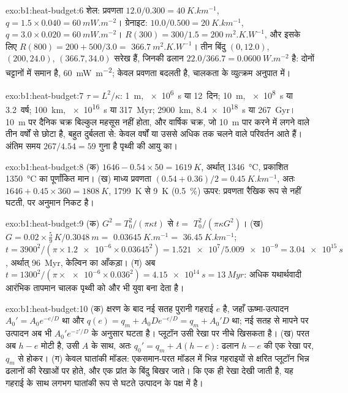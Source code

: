 \begin{solution}{exo:b1:heat-budget:6}
शेल: प्रवणता $12.0/0.300 = \qty{40}{K.km^{-1}}$, $q = 1.5\times0.040 =
\qty{60}{mW.m^{-2}}$। ग्रेनाइट: $10.0/0.500 = \qty{20}{K.km^{-1}}$,
$q = 3.0\times0.020 = \qty{60}{mW.m^{-2}}$। $R(300) = 300/1.5 =
\qty{200}{m^2.K.W^{-1}}$, और इसके लिए $R(800) = 200 + 500/3.0 =$ $\qty{366.7}{m^2.K.W^{-1}}$।
तीन बिंदु $(0, 12.0)$, $(200, 24.0)$, $(366.7, 34.0)$ सरेख हैं, जिनकी ढलान $22.0/366.7 = \qty{0.0600}{W.m^{-2}}$ है:  दोनों चट्टानों में
समान है, \qty{60}{mW.m^{-2}}; केवल प्रवणता बदलती है, चालकता के व्युत्क्रम अनुपात में।
\end{solution}

\begin{solution}{exo:b1:heat-budget:7}
$\tau = L^2/\kappa$: \qty{1}{m}, \qty{e6}{s} या \num{12}~दिन; \qty{10}{m},
\qty{e8}{s} या \num{3.2}~वर्ष; \qty{100}{km}, \qty{e16}{s} या
\qty{317}{Myr}; \qty{2900}{km}, \qty{8.4e18}{s} या \qty{267}{Gyr}। \qty{10}{m} पर दैनिक चक्र बिल्कुल महसूस नहीं होता, और वार्षिक चक्र, जो \qty{10}{m} पार करने में लगने वाले तीन वर्षों से छोटा है, बहुत दुर्बलता से: केवल वर्षों या उससे अधिक तक चलने वाले परिवर्तन आते हैं। अंतिम समय $267/4.54 = 59$ गुना है पृथ्वी की आयु का।
\end{solution}

\begin{solution}{exo:b1:heat-budget:8}
(क) $1646 - 0.54\times50 = \qty{1619}{K}$, अर्थात् \qty{1346}{\degreeCelsius},
प्रकाशित \qty{1350}{\degreeCelsius} का पूर्णांकित मान। (ख) माध्य प्रवणता
$(0.54 + 0.36)/2 = \qty{0.45}{K.km^{-1}}$, अतः $1646 + 0.45\times360 =
\qty{1808}{K}$, \qty{1799}{K} से \qty{9}{K} (\qty{0.5}{\percent}) ऊपर: प्रवणता रैखिक रूप से नहीं घटती, पर अनुमान निकट है।
\end{solution}

\begin{solution}{exo:b1:heat-budget:9}
(क) $G^2 = T_0^2/(\pi\kappa t)$ से $t =$ $T_0^2/(\pi\kappa G^2)$।
(ख) $G = 0.02\times\tfrac59\,\unit{K}/\qty{0.3048}{m} =$ $\qty{0.03645}{K.m^{-1}} =$
$\qty{36.45}{K.km^{-1}}$; $t = 3900^2/(\pi\times\num{1.2e-6}\times0.03645^2) =
\num{1.521e7}/\num{5.009e-9} = \qty{3.04e15}{s}$, अर्थात् \qty{96}{Myr}, केल्विन का आँकड़ा।
(ग) अब $t = 1300^2/(\pi\times\num{e-6}\times0.036^2) =
\qty{4.15e14}{s} = \qty{13}{Myr}$: अधिक यथार्थवादी आरंभिक तापमान चालक पृथ्वी को और भी युवा बना देता है।
\end{solution}

\begin{solution}{exo:b1:heat-budget:10}
(क) क्षरण के बाद नई सतह पुरानी गहराई $e$ है, जहाँ ऊष्मा-उत्पादन $A_0' = A_0e^{-e/D}$ था और  $q(e) = q_m +
A_0De^{-e/D} = q_m + A_0'D$ था; नई सतह से मापने पर उत्पादन अब भी $A_0'e^{-z'/D}$ के अनुसार घटता है। प्लूटॉन उसी रेखा पर नीचे खिसकता है।
(ख) परत अब $h - e$ मोटी है, उसी $A$ के साथ, अतः $q_0' = q_m + A(h - e)$: ढलान $h - e$ की एक रेखा पर, $q_m$ से होकर।
(ग) केवल घातांकी मॉडल: एकसमान-परत मॉडल में भिन्न गहराइयों से क्षरित प्लूटॉन भिन्न ढलानों की रेखाओं पर होते, और एक प्रांत के बिंदु बिखर जाते। कि एक ही रेखा देखी जाती है, यह गहराई के साथ लगभग घातांकी रूप से घटते उत्पादन के पक्ष में है।
\end{solution}

